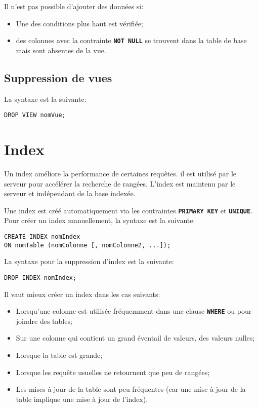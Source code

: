 \documentclass[a4paper, 12pt]{report}
\newcommand{\textSQL}[1]{\texttt{\textbf{#1}}}
\theoremstyle{definition} \newtheorem{ex}{Exemple}
\begin{document}
Il n'est pas possible d'ajouter des données si:
\begin{itemize}
  \item Une des conditions plus haut est vérifiée;
	\item des colonnes avec la contrainte \textSQL{NOT NULL} se trouvent dans la table de base mais sont absentes de la vue.
\end{itemize}

\section{Suppression de vues}
La syntaxe est la suivante:
\begin{lstlisting}[frame=single]
DROP VIEW nomVue;
\end{lstlisting}

\chapter{Index}
Un index améliore la performance de certaines requêtes. il est utilisé par le serveur pour accélérer la recherche de rangées. L'index est maintenu par le serveur et indépendant de la base indexée.

Une index est créé automatiquement via les contraintes \textSQL{PRIMARY KEY} et \textSQL{UNIQUE}. Pour créer un index manuellement, la syntaxe est la suivante:
\begin{lstlisting}[frame=single]
CREATE INDEX nomIndex
ON nomTable (nomColonne [, nomColonne2, ...]);
\end{lstlisting}

La syntaxe pour la suppression d'index est la suivante:
\begin{lstlisting}[frame=single]
DROP INDEX nomIndex;
\end{lstlisting}

Il vaut mieux créer un index dans les cas suivants:
\begin{itemize}
  \item Lorsqu'une colonne est utilisée fréquemment dans une clause \textSQL{WHERE} ou pour joindre des tables;
	\item Sur une colonne qui contient un grand éventail de valeurs, des valeurs nulles;
	\item Lorsque la table est grande;
	\item Lorsque les requête usuelles ne retournent que peu de rangées;
	\item Les mises à jour de la table sont peu fréquentes (car une mise à jour de la table implique une mise à jour de l'index).
\end{itemize}
\end{document}
